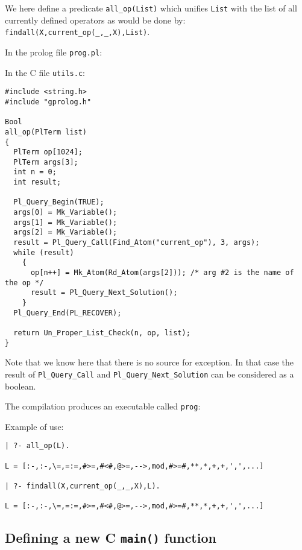 We here define a predicate \texttt{all\_op(List)} which unifies
\texttt{List} with the list of all currently defined operators as would be done by: \texttt{findall(X,current\_op(\_,\_,X),List)}.

In the prolog file \texttt{prog.pl}:


In the C file \texttt{utils.c}:

\begin{Indentation}
\begin{verbatim}
#include <string.h>
#include "gprolog.h"

Bool
all_op(PlTerm list)
{
  PlTerm op[1024];
  PlTerm args[3];
  int n = 0;
  int result;

  Pl_Query_Begin(TRUE);
  args[0] = Mk_Variable();
  args[1] = Mk_Variable();
  args[2] = Mk_Variable();
  result = Pl_Query_Call(Find_Atom("current_op"), 3, args);
  while (result)
    {
      op[n++] = Mk_Atom(Rd_Atom(args[2])); /* arg #2 is the name of the op */
      result = Pl_Query_Next_Solution();
    }
  Pl_Query_End(PL_RECOVER);

  return Un_Proper_List_Check(n, op, list);
}
\end{verbatim}
\end{Indentation}

Note that we know here that there is no source for exception. In that case
the result of \texttt{Pl\_Query\_Call} and \texttt{Pl\_Query\_Next\_Solution}
can be considered as a boolean.

The compilation produces an executable called \texttt{prog}:


Example of use:

\begin{Indentation}
\begin{verbatim}
| ?- all_op(L).

L = [:-,:-,\=,=:=,#>=,#<#,@>=,-->,mod,#>=#,**,*,+,+,',',...]

| ?- findall(X,current_op(_,_,X),L).

L = [:-,:-,\=,=:=,#>=,#<#,@>=,-->,mod,#>=#,**,*,+,+,',',...]
\end{verbatim}
\end{Indentation}


\subsection{Defining a new C \texttt{main()} function}

